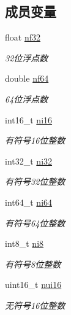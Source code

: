 \subsection*{成员变量}
\begin{DoxyCompactItemize}
\item 
float \hyperlink{structrpc__sample_1_1my__object__t_a72897bf89c2ddb75f977e87405646438}{nf32}
\begin{DoxyCompactList}\small\item\em 32位浮点数 \end{DoxyCompactList}\item 
double \hyperlink{structrpc__sample_1_1my__object__t_ab1cd61707e68d246e0096f4275c0d138}{nf64}
\begin{DoxyCompactList}\small\item\em 64位浮点数 \end{DoxyCompactList}\item 
int16\+\_\+t \hyperlink{structrpc__sample_1_1my__object__t_ae8b3700159b74a9b7d2ec0a7ea827ed4}{ni16}
\begin{DoxyCompactList}\small\item\em 有符号16位整数 \end{DoxyCompactList}\item 
int32\+\_\+t \hyperlink{structrpc__sample_1_1my__object__t_a93e8e1b4ecdf7dab9db55ecfe51344cc}{ni32}
\begin{DoxyCompactList}\small\item\em 有符号32位整数 \end{DoxyCompactList}\item 
int64\+\_\+t \hyperlink{structrpc__sample_1_1my__object__t_a65d691fd650bea991337c5c966f5203e}{ni64}
\begin{DoxyCompactList}\small\item\em 有符号64位整数 \end{DoxyCompactList}\item 
int8\+\_\+t \hyperlink{structrpc__sample_1_1my__object__t_aab8e35cb9f5f7c6e9e466d8d3698c05a}{ni8}
\begin{DoxyCompactList}\small\item\em 有符号8位整数 \end{DoxyCompactList}\item 
uint16\+\_\+t \hyperlink{structrpc__sample_1_1my__object__t_af4874e99994fc17939dbf1ac4ef00279}{nui16}
\begin{DoxyCompactList}\small\item\em 无符号16位整数 \end{DoxyCompactList}\item 

\end{DoxyCompactItemize}
